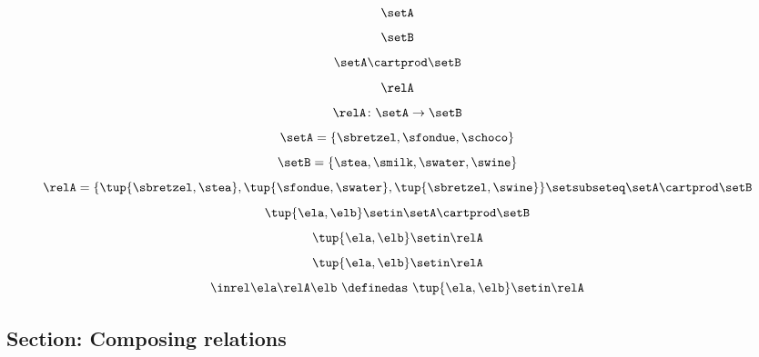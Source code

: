\begin{forslides}

    \begin{equation}\label{eq:slides_session2_rel_72}
        \setA
    \end{equation}
    \begin{equation}\label{eq:slides_session2_rel_73}
        \setB
    \end{equation}
    \begin{equation}\label{eq:slides_session2_rel_74}
        \setA \cartprod \setB
    \end{equation}
    \begin{equation}\label{eq:slides_session2_rel_75}
        \relA
    \end{equation}
    \begin{equation}\label{eq:slides_session2_rel_76}
        \relA \colon \setA \to \setB
    \end{equation}
    \begin{equation}\label{eq:slides_session2_rel_77}
        \setA = \{ \sbretzel, \sfondue, \schoco \}
    \end{equation}
    \begin{equation}\label{eq:slides_session2_rel_78}
        \setB = \{ \stea, \smilk, \swater, \swine \}
    \end{equation}
    \begin{equation}\label{eq:slides_session2_rel_79}
        \relA = \{ \tup{\sbretzel, \stea}, \tup{\sfondue, \swater}, \tup{\sbretzel, \swine} \} \setsubseteq \setA \cartprod \setB
    \end{equation}
    \begin{equation}\label{eq:slides_session2_rel_80}
        \tup{\ela,\elb} \setin \setA \cartprod \setB
    \end{equation}
    \begin{equation}\label{eq:slides_session2_rel_81}
        \tup{\ela,\elb} \setin \relA
    \end{equation}
    \begin{equation}\label{eq:slides_session2_rel_82}
        \tup{\ela,\elb}\setin \relA
    \end{equation}
    \begin{equation}\label{eq:slides_session2_rel_83}
        \inrel \ela \relA \elb \ \definedas\  \tup{\ela,\elb}\setin \relA
    \end{equation}

    \subsection{Section: Composing relations}


\end{forslides}
